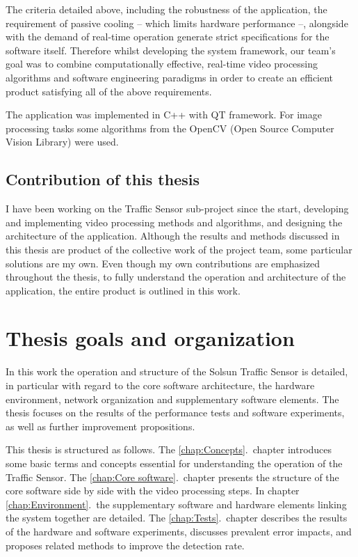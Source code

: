 The criteria detailed above, including the robustness of the application, the requirement of passive cooling -- which limits hardware performance --, alongside with the demand of real-time operation generate strict specifications for the software itself.
Therefore whilst developing the system framework, our team's goal was to combine computationally effective, real-time video processing algorithms and software engineering paradigms in order to create an efficient product satisfying all of the above requirements.

The application was implemented in C++ with QT framework.
For image processing tasks some algorithms from the OpenCV (Open Source Computer Vision Library) were used.

\subsection{Contribution of this thesis}

I have been working on the Traffic Sensor sub-project since the start, developing and implementing video processing methods and algorithms, and designing the architecture of the application.
Although the results and methods discussed in this thesis are product of the collective work of the project team, some particular solutions are my own. 
Even though my own contributions are emphasized throughout the thesis, to fully understand the operation and architecture of the application, the entire product is outlined in this work.

\section{Thesis goals and organization}
In this work the operation and structure of the Solsun Traffic Sensor is detailed, in particular with regard to the core software architecture, the hardware environment, network organization and supplementary software elements.
The thesis focuses on the results of the performance tests and software experiments, as well as further improvement propositions.

This thesis is structured as follows.
The \ref{chap:Concepts}.~chapter introduces some basic terms and concepts essential for understanding the operation of the Traffic Sensor. 
The \ref{chap:Core software}.~chapter presents the structure of the core software side by side with the video processing steps.
In chapter \ref{chap:Environment}.~the supplementary software and hardware elements linking the system together are detailed.
The \ref{chap:Tests}.~chapter describes the results of the hardware and software experiments, discusses prevalent error impacts, and proposes related methods to improve the detection rate.
